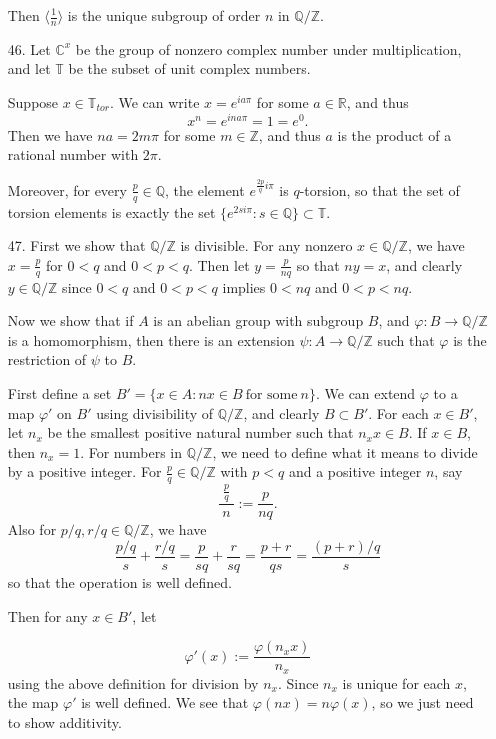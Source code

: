 \documentclass[11pt, reqno]{article}
\theoremstyle{plain}
\theoremstyle{definition}
\theoremstyle{remark}
\renewcommand{\phi}{\varphi}
\newcommand{\RR}{\mathbb{R}}
\newcommand{\ZZ}{\mathbb{Z}}
\newcommand{\CC}{\mathbb{C}}
\newcommand{\QQ}{\mathbb{Q}}
\begin{document}
\begin{enumerate}
    Then $\langle \frac{1}{n}\rangle$ is the unique subgroup of order $n$ in $\QQ/\ZZ$. 

    \item[46.] Let $\CC^x$ be the group of nonzero complex number under multiplication, and let 
    $\mathbb{T}$ be the subset of unit complex numbers. 

    Suppose $x \in \mathbb{T}_{tor}$. We can write $x = e^{ia\pi}$ for some $a \in \RR$, and thus
    \[
        x^n = e^{ina\pi} = 1 = e^{0}.
    \]
    Then we have $na = 2m\pi$ for some $m \in \ZZ$, and thus $a$ is the product of a rational
    number with $2\pi$. 

    Moreover, for every $\frac{p}{q} \in \QQ$, the element $e^{\frac{2p}{q}i\pi}$ is $q$-torsion, 
    so that the set of torsion elements is exactly the set $\{e^{2si\pi}: s \in \QQ\} \subset \mathbb{T}$.

    \item[47.] First we show that $\QQ/\ZZ$ is divisible. For any nonzero $x \in \QQ/\ZZ$, we have
    $x = \frac{p}{q}$ for $0 < q$ and $0 < p < q$. Then let $y = \frac{p}{nq}$ so that $ny = x$, 
    and clearly $y \in \QQ/\ZZ$ since $0 < q$ and $0 < p < q$ implies $0 < nq$ and $0 < p < nq$. 

    Now we show that if $A$ is an abelian group with subgroup $B$, and $\phi: B \rightarrow \QQ/\ZZ$ is a 
    homomorphism, then there is an extension $\psi: A \rightarrow \QQ/\ZZ$ such that $\phi$ is the 
    restriction of $\psi$ to $B$. 

    First define a set $B' = \{x \in A: nx \in B\ \text{for some}\ n\}$. We can extend $\phi$ to a map $\phi'$ on $B'$ using divisibility
    of $\QQ/\ZZ$, and clearly $B \subset B'$. For each $x \in B'$, let $n_x$ be the smallest positive 
    natural number such that $n_x x \in B$. If $x \in B$, then $n_x = 1$. For numbers in $\QQ/\ZZ$, we need to define
    what it means to divide by a positive integer. For $\frac{p}{q} \in \QQ/\ZZ$ with $p < q$ and a positive integer $n$, say
    \[
        \frac{\frac{p}{q}}{\ n\ } := \frac{p}{nq}.
    \]
    Also for $p/q, r/q \in \QQ/\ZZ$, we have
    \[
        \frac{p/q}{s} + \frac{r/q}{s} = \frac{p}{sq} + \frac{r}{sq} = \frac{p+r}{qs} = \frac{(p+r)/q}{s}
    \]
    so that the operation is well defined. 

    Then for any $x \in B'$, let

    \[
        \phi'(x) := \frac{\phi(n_x x)}{n_x}
    \]
    using the above definition for division by $n_x$. Since $n_x$ is unique for each $x$, the map
    $\phi'$ is well defined. We see that $\phi(nx) = n\phi(x)$, so we just need to show additivity. 


\end{enumerate}
\end{document}
